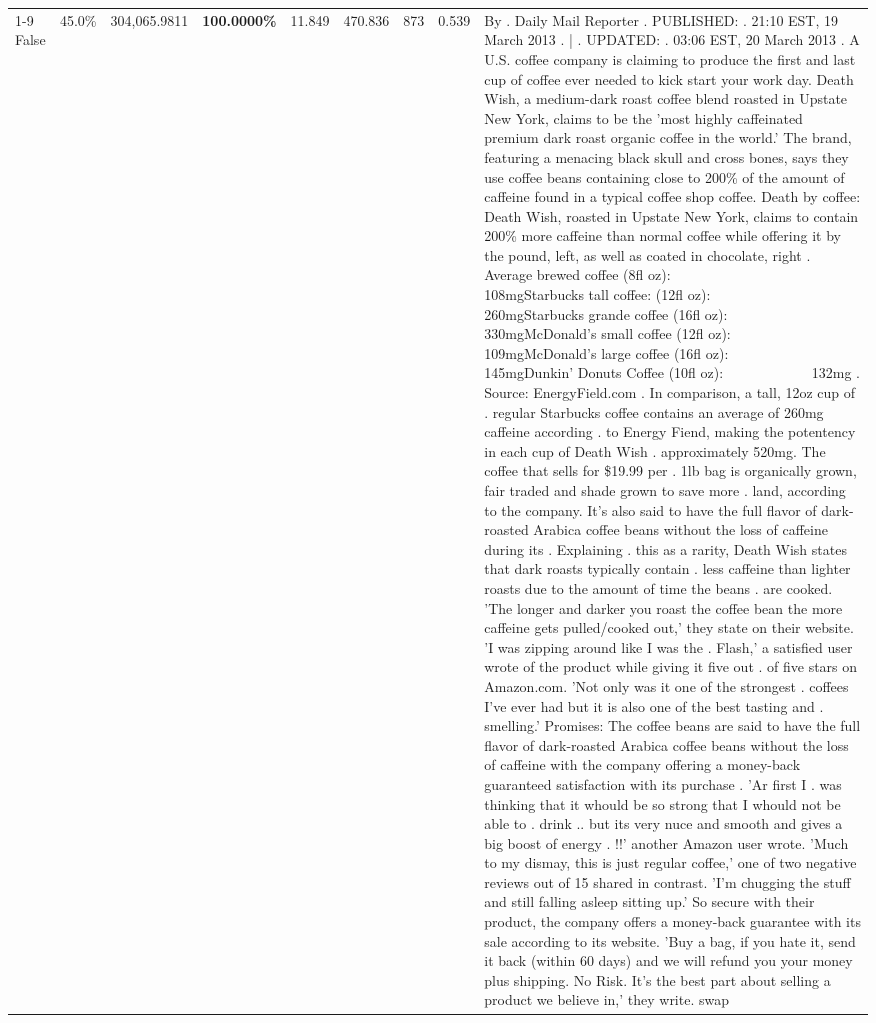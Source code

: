 \begin{table}[H]
{\begin{tabular}{lllrlllll}
\cline{1-9}
False & 45.0\% & 304,065.9811 & \bfseries \color{red} 100.0000\% & 11.849 & 470.836 & 873 & 0.539 & By . Daily Mail Reporter . PUBLISHED: . 21:10 EST, 19 March 2013 . | . UPDATED: . 03:06 EST, 20 March 2013 . A U.S. coffee company is claiming to produce the first and last cup of coffee ever needed to kick start your work day. Death Wish, a medium-dark roast coffee blend roasted in Upstate New York, claims to be the 'most highly caffeinated premium dark roast organic coffee in the world.' The brand, featuring a menacing black skull and cross bones, says they use coffee beans containing close to 200\% of the amount of caffeine found in a typical coffee shop coffee. Death by coffee: Death Wish, roasted in Upstate New York, claims to contain 200\% more caffeine than normal coffee while offering it by the pound, left, as well as coated in chocolate, right . Average brewed coffee (8fl oz):              108mgStarbucks tall coffee: (12fl oz):                260mgStarbucks grande coffee (16fl oz):         330mgMcDonald's small coffee (12fl oz):           109mgMcDonald's large coffee (16fl oz):           145mgDunkin' Donuts Coffee (10fl oz):             132mg . Source: EnergyField.com . In comparison, a tall, 12oz cup of . regular Starbucks coffee contains an average of 260mg caffeine according . to Energy Fiend, making the potentency in each cup of Death Wish . approximately 520mg. The coffee that sells for \$19.99 per . 1lb bag is organically grown, fair traded and shade grown to save more . land, according to the company. It's also said to have the full flavor of dark-roasted Arabica coffee beans without the loss of caffeine during its . Explaining . this as a rarity, Death Wish states that dark roasts typically contain . less caffeine than lighter roasts due to the amount of time the beans . are cooked. 'The longer and darker you roast the coffee bean the more caffeine gets pulled/cooked out,' they state on their website. 'I was zipping around like I was the . Flash,' a satisfied user wrote of the product while giving it five out . of five stars on Amazon.com. 'Not only was it one of the strongest . coffees I've ever had but it is also one of the best tasting and . smelling.’ Promises: The coffee beans are said to have the full flavor of dark-roasted Arabica coffee beans without the loss of caffeine with the company offering a money-back guaranteed satisfaction with its purchase . 'Ar first I . was thinking that it whould be so strong that I whould not be able to . drink .. but its very nuce and smooth and gives a big boost of energy . !!' another Amazon user wrote. 'Much to my dismay, this is just regular coffee,' one of two negative reviews out of 15 shared in contrast. 'I'm chugging the stuff and still falling asleep sitting up.' So secure with their product, the company offers a money-back guarantee with its sale according to its website. 'Buy a bag, if you hate it, send it back (within 60 days) and we will refund you your money plus shipping. No Risk. It’s the best part about selling a product we believe in,' they write. swap \\

\end{tabular}}
\end{table}

